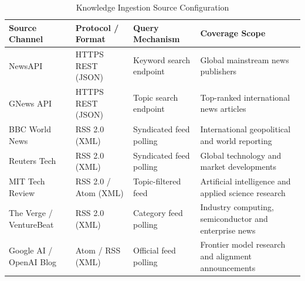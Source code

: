 \begin{table}[H]
\centering
\caption{Knowledge Ingestion Source Configuration}
\label{tab:news_sources}
\small
\renewcommand{\arraystretch}{1.3}
\begin{tabularx}{\linewidth}{|l|p{3.2cm}|p{2.8cm}|X|}
\hline
\textbf{Source Channel} & \textbf{Protocol / Format} & \textbf{Query Mechanism} & \textbf{Coverage Scope} \\
\hline
NewsAPI & HTTPS REST (JSON) & Keyword search endpoint & Global mainstream news publishers \\
\hline
GNews API & HTTPS REST (JSON) & Topic search endpoint & Top-ranked international news articles \\
\hline
BBC World News & RSS 2.0 (XML) & Syndicated feed polling & International geopolitical and world reporting \\
\hline
Reuters Tech & RSS 2.0 (XML) & Syndicated feed polling & Global technology and market developments \\
\hline
MIT Tech Review & RSS 2.0 / Atom (XML) & Topic-filtered feed & Artificial intelligence and applied science research \\
\hline
The Verge / VentureBeat & RSS 2.0 (XML) & Category feed polling & Industry computing, semiconductor and enterprise news \\
\hline
Google AI / OpenAI Blog & Atom / RSS (XML) & Official feed polling & Frontier model research and alignment announcements \\
\hline
\end{tabularx}
\end{table}


